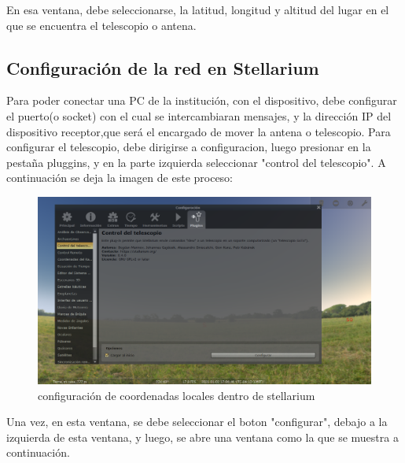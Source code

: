 En esa ventana, debe seleccionarse, la latitud, longitud y altitud del lugar en el que se encuentra el telescopio o antena. 

\subsection{Configuración de la red en Stellarium} \label{sub:conf_stellarium_red}

Para poder conectar una PC de la institución, con el dispositivo, debe configurar el puerto(o socket) con el cual se intercambiaran mensajes, y la dirección IP del dispositivo receptor,que será el encargado de mover la antena o telescopio. Para configurar el telescopio, debe dirigirse a configuracion, luego presionar en la pestaña pluggins, y en la parte izquierda seleccionar "control del telescopio". A continuación se deja la imagen de este proceso: 
 
\begin{figure}[h]
	\includegraphics[width=\textwidth]{conf_tel_red1} 
	\caption{configuración de coordenadas locales dentro de stellarium} 
	\label{fig:stell_conf_red}
\end{figure}

Una vez, en esta ventana, se debe seleccionar el boton "configurar", debajo a la izquierda de esta ventana, y luego, se abre una ventana como la que se muestra a continuación. 

